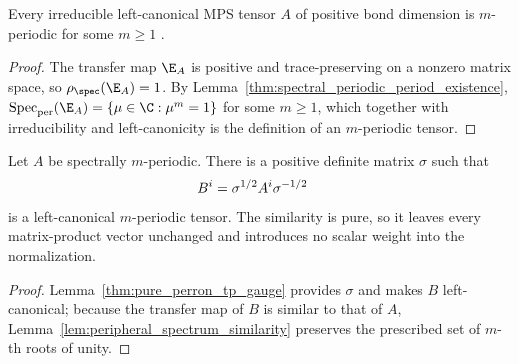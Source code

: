 \begin{lemma}
    \label{thm:irreducible_left_canonical_periodic}
    \leanok
    Every irreducible left-canonical MPS tensor $A$ of positive bond dimension
    is $m$-periodic for some $m\ge1$
    \cite[lines~248--258 and eq.~\emph{unital}]{DeLasCuevas2017Irreducible}.
\end{lemma}
\begin{proof}
    \leanok
    The transfer map $\E_A$ is positive and trace-preserving on a nonzero
    matrix space, so $\rho_{\spec}(\E_A)=1$. By
    Lemma~\ref{thm:spectral_periodic_period_existence},
    $\operatorname{Spec}_{\mathrm{per}}(\E_A)=\{\mu\in\C:\mu^m=1\}$ for some
    $m\ge1$, which together with irreducibility and left-canonicity is the
    definition of an $m$-periodic tensor.
\end{proof}

\begin{lemma}
    \label{thm:spectral_periodic_normalization}
    \leanok
    Let $A$ be spectrally $m$-periodic.  There is a positive definite matrix
    $\sigma$ such that
    \begin{align}
        B^i & =\sigma^{1/2}A^i\sigma^{-1/2}
        \notag
    \end{align}
    is a left-canonical $m$-periodic tensor.  The similarity is pure, so it
    leaves every matrix-product vector unchanged and introduces no scalar
    weight into the normalization.
\end{lemma}
\begin{proof}
    \leanok
    Lemma~\ref{thm:pure_perron_tp_gauge} provides $\sigma$ and makes $B$
    left-canonical; because the transfer map of $B$ is similar to that of $A$,
    Lemma~\ref{lem:peripheral_spectrum_similarity} preserves the prescribed
    set of $m$-th roots of unity.
\end{proof}

